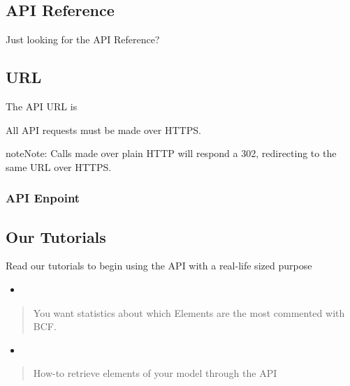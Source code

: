 \documentclass[a4paper,12pt,english]{sphinxmanual}
\begin{document}
\subsection{API Reference}
\label{\detokenize{api/introduction:api-reference}}
Just looking for the API Reference?




\subsection{URL}
\label{\detokenize{api/introduction:url}}
The API URL is 

All API requests must be made over HTTPS.

\begin{sphinxadmonition}{note}{Note:}
Calls made over plain HTTP will respond a 302, redirecting to the same URL over HTTPS.
\end{sphinxadmonition}


\subsubsection{API Enpoint}
\label{\detokenize{api/introduction:api-enpoint}}\begin{sphinxalltt}
\end{sphinxalltt}


\subsection{Our Tutorials}
\label{\detokenize{api/introduction:our-tutorials}}
Read our tutorials to begin using the API with a real-life sized purpose
\begin{itemize}
\item {} 

\end{itemize}
\begin{quote}

You want statistics about which Elements are the most commented with BCF.
\end{quote}
\begin{itemize}
\item {} 

\end{itemize}
\begin{quote}

How-to retrieve elements of your model through the API
\end{quote}
\end{document}
